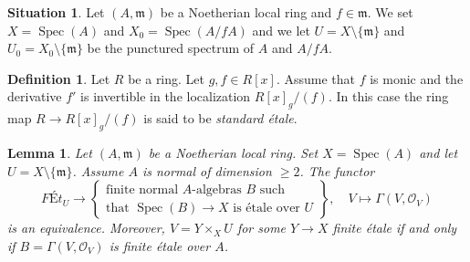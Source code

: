 \documentclass{amsart}
\theoremstyle{plain}
\newtheorem{lemma}[subsection]{Lemma}
\theoremstyle{definition}
\newtheorem{definition}[subsection]{Definition}
\newtheorem{situation}[subsection]{Situation}
\theoremstyle{remark}
\numberwithin{equation}{subsection}
\def\Spec{\mathop{\mathrm{Spec}}}
\begin{document}
\begin{situation}
\label{situation-local-lefschetz}
Let $(A, \mathfrak m)$ be a Noetherian local ring and $f \in \mathfrak m$.
We set $X = \Spec(A)$ and $X_0 = \Spec(A/fA)$ and we
let $U = X \setminus \{\mathfrak m\}$ and
$U_0 = X_0 \setminus \{\mathfrak m\}$ be the punctured spectrum of
$A$ and $A/fA$.
\end{situation}

\begin{definition}
\label{algebra-definition-standard-etale}
Let $R$ be a ring. Let $g , f  \in R[x]$.
Assume that $f$ is monic and the derivative $f'$ is invertible in
the localization $R[x]_g/(f)$.
In this case the ring map $R \to R[x]_g/(f)$ is said to be
{\it standard \'etale}.
\end{definition}

\begin{lemma}
\label{lemma-reformulate-purity-normal}
Let $(A, \mathfrak m)$ be a Noetherian local ring. Set $X = \Spec(A)$
and let $U = X \setminus \{\mathfrak m\}$. Assume $A$ is normal
of dimension $\geq 2$. The functor
$$
\textit{F\'Et}_U \longrightarrow
\left\{
\begin{matrix}
\text{finite normal }A\text{-algebras }B\text{ such} \\
\text{that }\Spec(B) \to X\text{ is \'etale over }U
\end{matrix}
\right\},
\quad
V \longmapsto \Gamma(V, \mathcal{O}_V)
$$
is an equivalence. Moreover, $V = Y \times_X U$ for some $Y \to X$
finite \'etale if and only if $B = \Gamma(V, \mathcal{O}_V)$
is finite \'etale over $A$.
\end{lemma}
\end{document}
